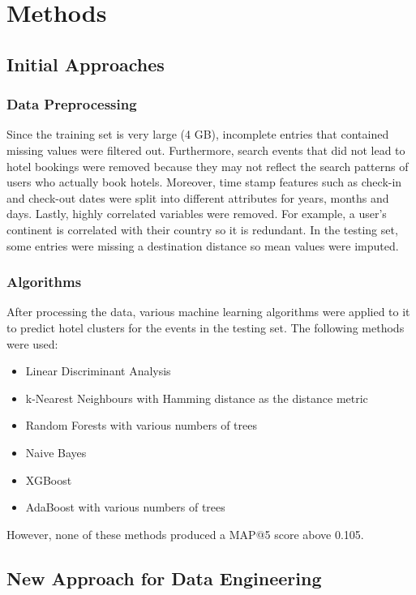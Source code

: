 \documentclass[12pt]{report}
\begin{document}
\chapter{Methods}

\section{Initial Approaches}
\subsection{Data Preprocessing}
Since the training set is very large (4 GB), incomplete entries that contained missing values were filtered out. Furthermore, search events that did not lead to hotel bookings were removed because they may not reflect the search patterns of users who actually book hotels. Moreover, time stamp features such as check-in and check-out dates were split into different attributes for years, months and days. Lastly, highly correlated variables were removed. For example, a user's continent is correlated with their country so it is redundant. In the testing set, some entries were missing a destination distance so mean values were imputed.\\

\subsection{Algorithms}
After processing the data, various machine learning algorithms were applied to it to predict hotel clusters for the events in the testing set. The following methods were used: 
\begin{itemize}
\setlength\itemsep{0.1em}
	\item Linear Discriminant Analysis 
	\item k-Nearest Neighbours with Hamming distance as the distance metric 
	\item Random Forests with various numbers of trees 
	\item Naive Bayes 
	\item XGBoost  
	\item AdaBoost with various numbers of trees 
\end{itemize}
However, none of these methods produced a MAP@5 score above 0.105.

\section{New Approach for Data Engineering}
\end{document}
